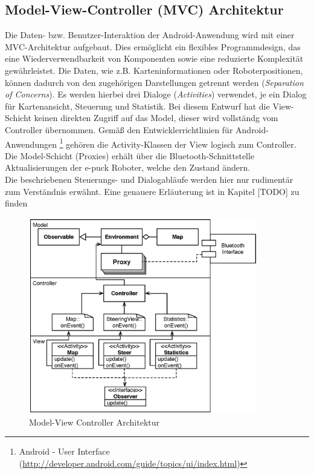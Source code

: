 \documentclass[10pt,a4paper]{article}
\begin{document}
			\subsection{Model-View-Controller (MVC) Architektur}
				Die Daten- bzw. Benutzer-Interaktion der Android-Anwendung wird mit einer MVC-Architektur aufgebaut. Dies ermöglicht ein
				flexibles Programmdesign, das eine Wiederverwendbarkeit von Komponenten sowie eine reduzierte Komplexität gewährleistet.
				Die Daten, wie z.B. Karteninformationen oder Roboterpositionen, können dadurch von den zugehörigen Darstellungen getrennt werden
				(\textit{Separation of Concerns}). Es werden hierbei drei Dialoge (\textit{Activities}) verwendet, je ein Dialog für Kartenansicht, Steuerung und
				Statistik. Bei diesem Entwurf hat die View-Schicht keinen direkten Zugriff auf das Model, dieser wird vollständg vom
				Controller übernommen. Gemäß den Entwicklerrichtlinien für Android-Anwendungen 
				\footnote{Android - User Interface (\url{http://developer.android.com/guide/topics/ui/index.html})} gehören die Activity-Klassen der
				View logisch zum	Controller. Die Model-Schicht (Proxies) erhält über die Bluetooth-Schnittstelle Aktualisierungen der e-puck Roboter,
				welche den Zustand ändern.\\
				Die beschriebenen Steuerungs- und Dialogabläufe werden hier nur rudimentär zum Verständnis erwähnt. Eine genauere Erläuterung ist in
				Kapitel [TODO] zu finden
	  			\begin{figure}
					\centering
					\includegraphics[width=10cm]{images/android_mvc.eps}
  					\caption{Model-View Controller Architektur}
 	 			\end{figure}					
\end{document}
